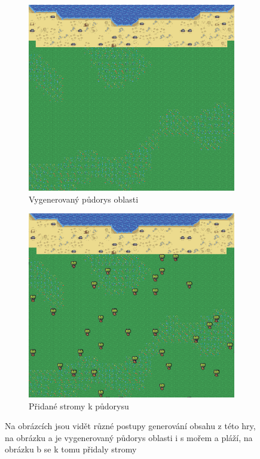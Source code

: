 \begin{figure}[h]
	\centering
	\begin{subfigure}{0.475\textwidth}
		\centering
		\includegraphics[scale=0.5]{obrazky-figures/layoutNoTrees.png}
		\caption{Vygenerovaný půdorys oblasti}
	\end{subfigure}
	\begin{subfigure}{0.475\textwidth}
		\centering
		\includegraphics[scale=0.5]{obrazky-figures/treesAdded.png}
		\caption{Přidané stromy k půdorysu}
	\end{subfigure}
	\caption{Na obrázcích jsou vidět různé postupy generování obsahu z této hry, na obrázku a je vygenerovaný půdorys oblasti i s mořem a pláží, na obrázku b se k tomu přidaly stromy}
\end{figure}

